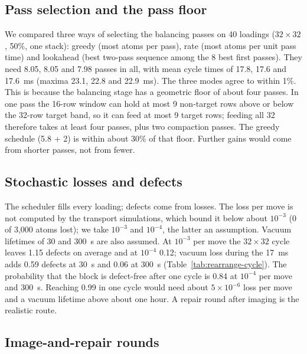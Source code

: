 \subsection{Pass selection and the pass floor}\label{sec:rearrange-modes}

We compared three ways of selecting the balancing passes on 40 loadings ($32\times32$, 50\%, one stack): greedy (most atoms per pass), rate (most atoms per unit pass time) and lookahead (best two-pass sequence among the 8 best first passes). They need 8.05, 8.05 and 7.98 passes in all, with mean cycle times of 17.8, 17.6 and 17.6~ms (maxima 23.1, 22.8 and 22.9~ms). The three modes agree to within 1\%. This is because the balancing stage has a geometric floor of about four passes. In one pass the 16-row window can hold at most 9 non-target rows above or below the 32-row target band, so it can feed at most 9 target rows; feeding all 32 therefore takes at least four passes, plus two compaction passes. The greedy schedule (5.8 + 2) is within about 30\% of that floor. Further gains would come from shorter passes, not from fewer.

\subsection{Stochastic losses and defects}\label{sec:rearrange-loss}

The scheduler fills every loading; defects come from losses. The loss per move is not computed by the transport simulations, which bound it below about $10^{-3}$ (0 of 3,000 atoms lost); we take $10^{-3}$ and $10^{-4}$, the latter an assumption. Vacuum lifetimes of 30 and 300~s are also assumed. At $10^{-3}$ per move the $32\times32$ cycle leaves 1.15 defects on average and at $10^{-4}$ 0.12; vacuum loss during the 17~ms adds 0.59 defects at 30~s and 0.06 at 300~s (Table~\ref{tab:rearrange-cycle}). The probability that the block is defect-free after one cycle is 0.84 at $10^{-4}$ per move and 300~s. Reaching 0.99 in one cycle would need about $5\times10^{-6}$ loss per move and a vacuum lifetime above about one hour. A repair round after imaging is the realistic route.

\subsection{Image-and-repair rounds}\label{sec:rearrange-repair}

